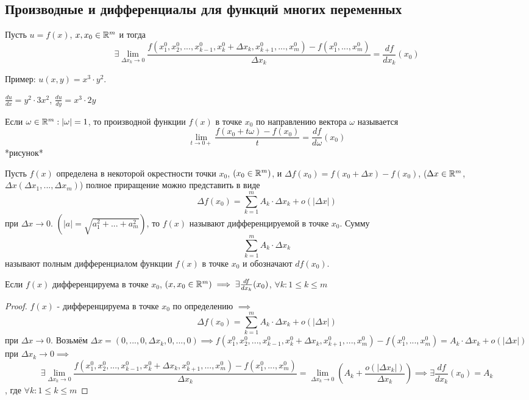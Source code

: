 \subsection{Производные и дифференциалы для функций многих переменных}
\begin{definition}
    Пусть $u = f(x)$, $x, x_0 \in \mathbb{R}^m$ и тогда $$\exists \lim_{\Delta x_k \to 0} \frac{f(x^0_1, x^0_2, ..., x^0_{k-1}, x^0_k+\Delta x_k, x^0_{k+1}, ..., x^0_m)-f(x^0_1, ..., x^0_m)}{\Delta x_k}=\frac{df}{dx_k}(x_0)$$

    Пример: $u(x, y) = x^3 \cdot y^2$. 
    
    $\frac{du}{dx} = y^2 \cdot 3x^2$, $\frac{du}{dy} = x^3 \cdot 2y$
\end{definition}
\begin{definition}
    Если $\omega \in \mathbb{R}^m: |\omega| = 1$, то производной функции $f(x)$ в точке $x_0$ по направлению вектора $\omega$ называется $$\lim_{t \to 0+} \frac{f(x_0+t\omega)-f(x_0)}{t} = \frac{df}{d\omega}(x_0)$$
*рисунок*
\end{definition}

\begin{definition}
    Пусть $f(x)$ определена в некоторой окрестности точки $x_0$, $(x_0 \in \mathbb{R}^m)$, и $\Delta f(x_0) = f(x_0+\Delta x) - f(x_0)$, ($\Delta x \in \mathbb{R}^m$, $\Delta x(\Delta x_1, ..., \Delta x_m)$) полное приращение можно представить в виде $$\Delta f(x_0) = \sum_{k=1}^m A_k \cdot \Delta x_k + o(|\Delta x|)$$ при $\Delta x \to 0$.
    $(|a| = \sqrt{a^2_1+...+a^2_m})$, то $f(x)$ называют дифференцируемой в точке $x_0$. Сумму $$\sum_{k=1}^m A_k \cdot \Delta x_k$$ называют полным дифференциалом функции $f(x)$ в точке $x_0$ и обозначают $df(x_0)$.
\end{definition}

\begin{theorem}
    Если $f(x)$ дифференцируема в точке $x_0$, $(x, x_0 \in \mathbb{R}^m) \implies \exists \frac{df}{dx_k}(x_0)$, $\forall k: 1 \leq k \leq m$
\end{theorem}
\begin{proof}
    $f(x)$ - дифференцируема в точке $x_0$ по определению $\implies$ $$\Delta f(x_0) = \sum_{k=1}^m A_k \cdot \Delta x_k + o(|\Delta x|)$$ при $\Delta x \to 0$.
    Возьмём $\Delta x = (0,..., 0, \Delta x_k, 0,...,0) \implies f(x^0_1, x^0_2, ..., x^0_{k-1}, x^0_k+\Delta x_k, x^0_{k+1}, ..., x^0_m)-f(x^0_1, ..., x^0_m) = A_k \cdot \Delta x_k + o(|\Delta x|)$ при $\Delta x_k \to 0 \implies$ 
    $$\exists \lim_{\Delta x_k \to 0} \frac{f(x^0_1, x^0_2, ..., x^0_{k-1}, x^0_k+\Delta x_k, x^0_{k+1}, ..., x^0_m)-f(x^0_1, ..., x^0_m)}{\Delta x_k} = \lim_{\Delta x_k \to 0} (A_k + \frac{o(|\Delta x_k|)}{\Delta x_k}) \implies \exists \frac{df}{dx_k}(x_0) = A_k$$, где $\forall k: 1 \leq k \leq m$
\end{proof}


